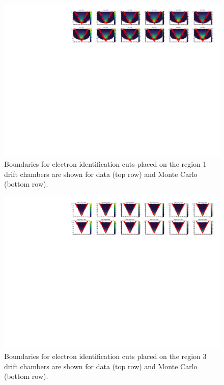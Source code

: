 \begin{figure}
  \centering
  \includegraphics[width=\textwidth]{image/plots/sidis/systematics/region1.pdf}
  \caption[Systematic boundaries on region 1]{Boundaries for electron identification cuts placed on the region 1 drift chambers are shown for data (top row) and Monte Carlo (bottom row).}
    \label{fig:systematics-region1}

\end{figure}

\begin{figure}
  \centering
  \includegraphics[width=\textwidth]{image/plots/sidis/systematics/region3.pdf}
  \caption[Systematic boundaries on region 3]{Boundaries for electron identification cuts placed on the region 3 drift chambers are shown for data (top row) and Monte Carlo (bottom row).}
    \label{fig:systematics-region3}

\end{figure}


